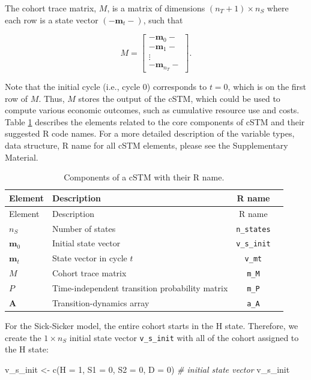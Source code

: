 \documentclass[
]{article}
\newenvironment{Shaded}{\begin{snugshade}}{\end{snugshade}}
\newcommand{\AttributeTok}[1]{\textcolor[rgb]{0.77,0.63,0.00}{#1}}
\newcommand{\CommentTok}[1]{\textcolor[rgb]{0.56,0.35,0.01}{\textit{#1}}}
\newcommand{\DecValTok}[1]{\textcolor[rgb]{0.00,0.00,0.81}{#1}}
\newcommand{\FunctionTok}[1]{\textcolor[rgb]{0.00,0.00,0.00}{#1}}
\newcommand{\NormalTok}[1]{#1}
\newcommand{\OtherTok}[1]{\textcolor[rgb]{0.56,0.35,0.01}{#1}}
\begin{document}
The cohort trace matrix, \(M\), is a matrix of dimensions \((n_T+1) \times n_S\) where each row is a state vector \((-\mathbf{m}_{t}-)\), such that

\[
  M = 
  \begin{bmatrix}
    - \mathbf{m}_0 -  \\
    - \mathbf{m}_1 -  \\
     \vdots \\
    - \mathbf{m}_{n_T} -  
  \end{bmatrix}. 
\]

Note that the initial cycle (i.e., cycle 0) corresponds to \(t=0\), which is on the first row of \(M\). Thus, \(M\) stores the output of the cSTM, which could be used to compute various economic outcomes, such as cumulative resource use and costs. Table \ref{tab:cSTM-components-table} describes the elements related to the core components of cSTM and their suggested R code names. For a more detailed description of the variable types, data structure, R name for all cSTM elements, please see the Supplementary Material.

\begin{longtable}[]{@{}llcl@{}}
\caption{\label{tab:cSTM-components-table} Components of a cSTM with their R name.}\tabularnewline
\toprule
Element & Description & R name &\tabularnewline
\midrule
\endfirsthead
\toprule
Element & Description & R name &\tabularnewline
\midrule
\endhead
\(n_S\) & Number of states & \texttt{n\_states} &\tabularnewline
\(\mathbf{m}_0\) & Initial state vector & \texttt{v\_s\_init} &\tabularnewline
\(\mathbf{m}_t\) & State vector in cycle \(t\) & \texttt{v\_mt} &\tabularnewline
\(M\) & Cohort trace matrix & \texttt{m\_M} &\tabularnewline
\(P\) & Time-independent transition probability matrix & \texttt{m\_P} &\tabularnewline
\(\mathbf{A}\) & Transition-dynamics array & \texttt{a\_A} &\tabularnewline
\bottomrule
\end{longtable}

For the Sick-Sicker model, the entire cohort starts in the H state. Therefore, we create the \(1 \times n_S\) initial state vector \texttt{v\_s\_init} with all of the cohort assigned to the H state:

\begin{Shaded}
\begin{Highlighting}[]
\NormalTok{v\_s\_init }\OtherTok{\textless{}{-}} \FunctionTok{c}\NormalTok{(}\AttributeTok{H =} \DecValTok{1}\NormalTok{, }\AttributeTok{S1 =} \DecValTok{0}\NormalTok{, }\AttributeTok{S2 =} \DecValTok{0}\NormalTok{, }\AttributeTok{D =} \DecValTok{0}\NormalTok{) }\CommentTok{\# initial state vector}
\NormalTok{v\_s\_init}
\end{Highlighting}
\end{Shaded}
\end{document}

